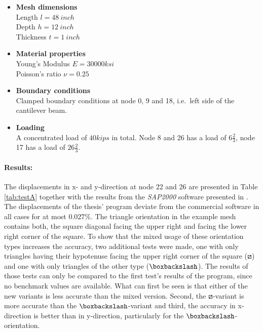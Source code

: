    \begin{itemize}
   \item \textbf{Mesh dimensions}\\
   Length $l = 48\ inch$\\
   Depth $h = 12\ inch$\\
   Thickness $t = 1\ inch$
   
   \item \textbf{Material properties}\\
   Young's Modulus $E = 30000 ksi$\\
   Poisson's ratio $\nu = 0.25$
   
   \item \textbf{Boundary conditions}\\
   Clamped boundary conditions at node 0, 9 and 18, i.e.\ left side of the cantilever beam.
   
   \item \textbf{Loading}\\
   A concentrated load of $40 kips$ in total. Node 8 and 26 has a load of $6 \frac{2}{3}$, node 17 has a load of $26 \frac{2}{3}$.
   \end{itemize}
   
   \paragraph{Results:} The displacements in x- and y-direction at node 22 and 26 are presented in Table \ref{tab:testA} together with the results from the \textit{SAP2000} software presented in \cite{kansara2004development}. The displacements of the thesis' program deviate from the commercial software in all cases for at most $0.027\%$. The triangle orientation in the example mesh contains both, the square diagonal facing the upper right and facing the lower right corner of the square. To show that the mixed usage of these orientation types increases the accuracy, two additional tests were made, one with only triangles having their hypotenuse facing the upper right corner of the square ($\boxslash$) and one with only triangles of the other type ($\boxbackslash$). The results of those tests can only be compared to the first test's results of the program, since no benchmark values are available. What can first be seen is that either of the new variants is less accurate than the mixed version. Second, the $\boxslash$-variant is more accurate than the $\boxbackslash$-variant and third, the accuracy in x-direction is better than in y-direction, particularly for the $\boxbackslash$-orientation.
   
